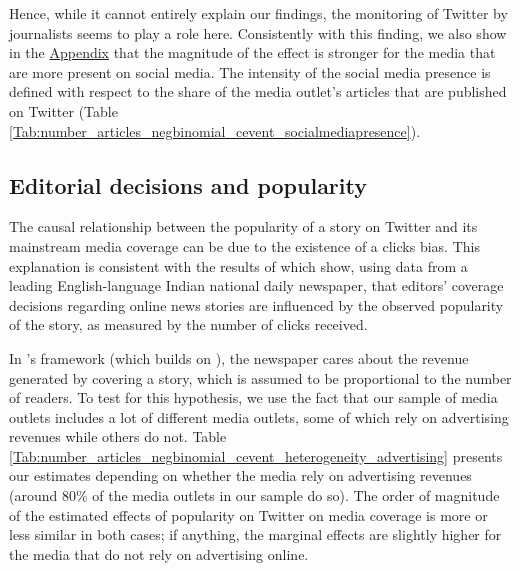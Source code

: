Hence, while it cannot entirely explain our findings, the monitoring of Twitter by journalists seems to play a role here. Consistently with this finding, we also show in the \hyperlink{ref:Appendix}{Appendix} that the magnitude of the effect is stronger for the media that are more present on social media. The intensity of the social media presence is defined with respect to the share of the media outlet's articles that are published on Twitter (Table \ref{Tab:number_articles_negbinomial_cevent_socialmediapresence}).


%
%



\subsection{Editorial decisions and popularity}

The causal relationship between the popularity of a story on Twitter and its mainstream media coverage can be due to the existence of a clicks bias. This explanation is consistent with the results of \citet{SenYildirim2015} which show, using data from a leading English-language Indian national daily newspaper, that editors' coverage decisions regarding online news stories are influenced by the observed popularity of the story, as measured by the number of clicks received.

In \citet{SenYildirim2015}'s framework (which builds on \citet{Latham2015}), the newspaper cares about the revenue generated by covering a story, which is assumed to be proportional to the number of readers. To test for this hypothesis, we use the fact that our sample of media outlets includes a lot of different media outlets, some of which rely on advertising revenues while others do not. Table \ref{Tab:number_articles_negbinomial_cevent_heterogeneity_advertising} presents our estimates depending on whether the media rely on advertising revenues (around 80\% of the media outlets in our sample do so). The order of magnitude of the estimated effects of popularity on Twitter on media coverage is more or less similar in both cases; if anything, the marginal effects are slightly higher for the media that do not rely on advertising online.


